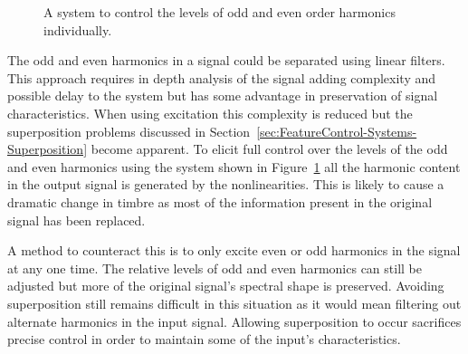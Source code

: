 \begin{figure}[h!]
			\caption{A system to control the levels of odd and even order harmonics individually.}
			\label{fig:HarmonicParitySystem}
		\end{figure}

		The odd and even harmonics in a signal could be separated using linear filters. This approach requires in
		depth analysis of the signal adding complexity and possible delay to the system but has some advantage in
		preservation of signal characteristics. When using excitation this complexity is reduced but the
		superposition problems discussed in Section~\ref{sec:FeatureControl-Systems-Superposition} become apparent.
		To elicit full control over the levels of the odd and even harmonics using the system shown in
		Figure~\ref{fig:HarmonicParitySystem} all the harmonic content in the output signal is generated by the
		nonlinearities. This is likely to cause a dramatic change in timbre as most of the information present in
		the original signal has been replaced. 

		A method to counteract this is to only excite even or odd harmonics in the signal at any one time.  The
		relative levels of odd and even harmonics can still be adjusted but more of the original signal's spectral
		shape is preserved. Avoiding superposition still remains difficult in this situation as it would mean
		filtering out alternate harmonics in the input signal. Allowing superposition to occur sacrifices precise
		control in order to maintain some of the input's characteristics.

